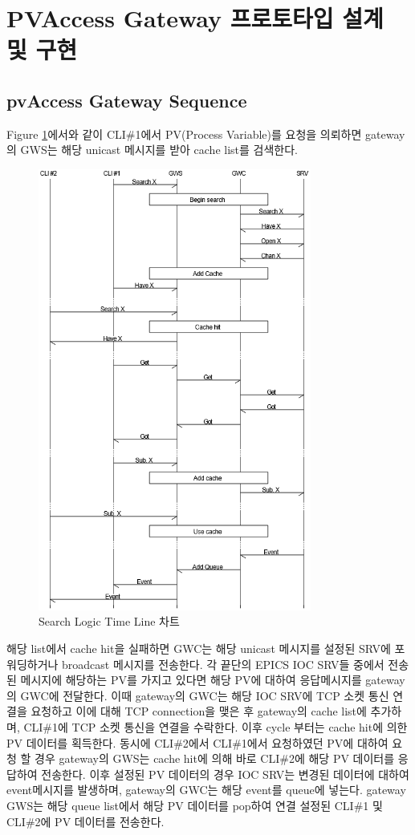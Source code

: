 \documentclass[11pt
  , a4paper
  , article
  , oneside
]{memoir}
\begin{document}
\section{PVAccess Gateway 프로토타입 설계 및 구현}
\subsection{pvAccess Gateway Sequence}
Figure \ref{fig:search}에서와 같이 CLI\#1에서 PV(Process Variable)를 요청을 의뢰하면 gateway의 GWS는 해당 unicast 메시지를 받아 cache list를 검색한다.

\begin{figure}[!htb]
	\centering
	\includegraphics[width=0.8\textwidth, height=0.5\textheight]{./images/search.png}
	\caption{
		Search Logic Time Line 차트
	}
	\label{fig:search}   
\end{figure}

 해당 list에서 cache hit을 실패하면 GWC는 해당 unicast 메시지를 설정된 SRV에 포워딩하거나 broadcast 메시지를 전송한다. 각 끝단의 EPICS IOC SRV들 중에서 전송된 메시지에 해당하는 PV를 가지고 있다면 해당 PV에 대하여 응답메시지를 gateway의 GWC에 전달한다. 이때 gateway의 GWC는 해당 IOC SRV에 TCP 소켓 통신 연결을 요청하고 이에 대해 TCP connection을 맺은 후 gateway의 cache list에 추가하며, CLI\#1에 TCP 소켓 통신을 연결을 수락한다. 이후 cycle 부터는 cache hit에 의한 PV 데이터를 획득한다. 동시에 CLI\#2에서 CLI\#1에서 요청하였던 PV에 대하여 요청 할 경우 gateway의 GWS는 cache hit에 의해 바로 CLI\#2에 해당 PV 데이터를 응답하여 전송한다. 이후 설정된 PV 데이터의 경우 IOC SRV는 변경된 데이터에 대하여 event메시지를 발생하며, gateway의 GWC는 해당 event를 queue에 넣는다. gateway GWS는 해당 queue list에서 해당 PV 데이터를 pop하여 연결 설정된 CLI\#1 및 CLI\#2에 PV 데이터를 전송한다. 
\end{document}
